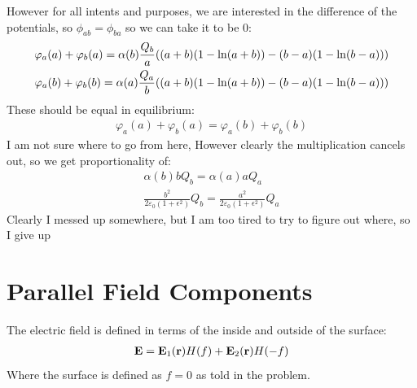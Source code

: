 \documentclass[12pt]{article}
\newcommand{\vphi}{\varphi}
\newcommand{\eps}{\epsilon}
\begin{document}
However for all intents and purposes, we are interested in the difference of the potentials, so $\phi_{ab}=\phi_{ba}$ so we can take it to be $0$:
\begin{align*}
  \vphi_a(a)+\vphi_b(a)=\alpha(b)\frac{Q_b}a\qty((a+b)(1-\ln(a+b))
  -(b-a)(1-\ln(b-a)))\\
  \vphi_a(b)+\vphi_b(b)=\alpha(a)\frac{Q_a}b\qty((a+b)(1-\ln(a+b))
  -(b-a)(1-\ln(b-a)))
\end{align*}
These should be equal in equilibrium:
\begin{align*}
  \vphi_a(a)+\vphi_b(a)=\vphi_a(b)+\vphi_b(b)
\end{align*}
I am not sure where to go from here, However clearly the multiplication cancels out, so we get proportionality of:
\begin{gather*}
  \alpha(b)bQ_b=\alpha(a)aQ_a\\
  \frac{b^2}{2\varepsilon_0(1+\eps^2)}Q_b=
  \frac{a^2}{2\varepsilon_0(1+\eps^2)}Q_a
\end{gather*}
Clearly I messed up somewhere, but I am too tired to try to figure out where, so I give up
\section{Parallel Field Components}
The electric field is defined in terms of the inside and outside of the surface:
\begin{align*}
  \vb{E}=\vb{E}_1(\vb{r})H(f)+\vb{E}_2(\vb{r})H(-f)
\end{align*}
Where the surface is defined as $f=0$ as told in the problem.
\end{document}
